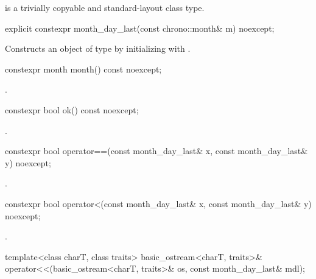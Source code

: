 \pnum
{} is a trivially copyable and standard-layout class type.

%
\begin{itemdecl}
explicit constexpr month_day_last(const chrono::month& m) noexcept;
\end{itemdecl}

\begin{itemdescr}
\pnum
\effects
Constructs an object of type  by
initializing  with .
\end{itemdescr}

%
\begin{itemdecl}
constexpr month month() const noexcept;
\end{itemdecl}

\begin{itemdescr}
\pnum
\returns {}.
\end{itemdescr}

%
\begin{itemdecl}
constexpr bool ok() const noexcept;
\end{itemdecl}

\begin{itemdescr}
\pnum
\returns {}.
\end{itemdescr}

%
\begin{itemdecl}
constexpr bool operator==(const month_day_last& x, const month_day_last& y) noexcept;
\end{itemdecl}

\begin{itemdescr}
\pnum
\returns {}.
\end{itemdescr}

%
\begin{itemdecl}
constexpr bool operator<(const month_day_last& x, const month_day_last& y) noexcept;
\end{itemdecl}

\begin{itemdescr}
\pnum
\returns {}.
\end{itemdescr}

%
\begin{itemdecl}
template<class charT, class traits>
  basic_ostream<charT, traits>&
    operator<<(basic_ostream<charT, traits>& os, const month_day_last& mdl);
\end{itemdecl}


